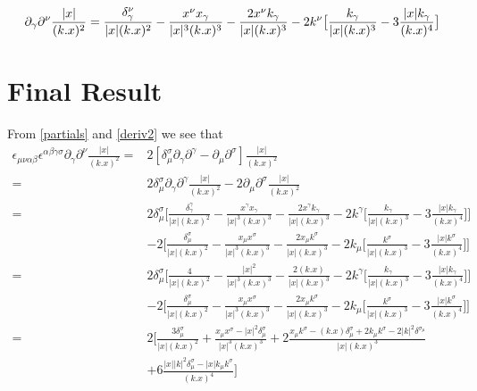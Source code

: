 \documentclass[10pt,a4paper]{article}
\begin{document}
	\begin{equation}
		\partial_{\gamma}\partial^{\nu}\frac{\lvert x \rvert}{(k.x)^{2}}\\ =
			\frac{\delta_{\gamma}^{\nu}}{\lvert x \rvert (k.x)^{2}} -\frac{x^{\nu}x_{\gamma}}{\lvert x \rvert ^{3} (k.x)^3} -\frac{2 x^{\nu} k_{\gamma}}{\lvert x \rvert (k.x)^{3}}-
			2k^{\nu}\big[\frac{k_{\gamma}}{\lvert x \rvert (k.x)^{3}}  - 3\frac{\lvert x \rvert k_{\gamma}}{(k.x)^{4}}\big]\label{deriv2}
	\end{equation}
	\section{Final Result}
	From \ref{partials} and \ref{deriv2} we see that
	\begin{align*}
		\epsilon_{\mu\nu\alpha\beta}\epsilon^{\alpha\beta\gamma\sigma}\partial_{\gamma}\partial^{\nu}\frac{\lvert x \rvert}{(k.x)^{2}}
	=&2[\delta_{\mu}^{\sigma}\partial_{\gamma}\partial^{\gamma}-\partial_{\mu}\partial^{\sigma}]\frac{\lvert x \rvert}{(k.x)^{2}}\\
	=&2\delta_{\mu}^{\sigma}\partial_{\gamma}\partial^{\gamma}\frac{\lvert x \rvert}{(k.x)^{2}}-2\partial_{\mu}\partial^{\sigma}\frac{\lvert x \rvert}{(k.x)^{2}}\\
	=&2\delta_{\mu}^{\sigma}\bigg[\frac{\delta_{\gamma}^{\gamma}}{\lvert x \rvert (k.x)^{2}} -\frac{x^{\gamma}x_{\gamma}}{\lvert x \rvert ^{3} (k.x)^3} -\frac{2 x^{\gamma} k_{\gamma}}{\lvert x \rvert (k.x)^{3}}-
2k^{\gamma}\big[\frac{k_{\gamma}}{\lvert x \rvert (k.x)^{3}}  - 3\frac{\lvert x \rvert k_{\gamma}}{(k.x)^{4}}\big]\bigg]\\&-2\bigg[\frac{\delta_{\mu}^{\sigma}}{\lvert x \rvert (k.x)^{2}} -\frac{x_{\mu}x^{\sigma}}{\lvert x \rvert ^{3} (k.x)^3} -\frac{2 x_{\mu} k^{\sigma}}{\lvert x \rvert (k.x)^{3}}-
2k_{\mu}\big[\frac{k^{\sigma}}{\lvert x \rvert (k.x)^{3}}  - 3\frac{\lvert x \rvert k^{\sigma}}{(k.x)^{4}}\big]\bigg]\\
	=&2\delta_{\mu}^{\sigma}\bigg[\frac{4}{\lvert x \rvert (k.x)^{2}} -\frac{\lvert x \rvert^{2}}{\lvert x \rvert ^{3} (k.x)^3} -\frac{2 (k.x)}{\lvert x \rvert (k.x)^{3}}-
	2k^{\gamma}\big[\frac{k_{\gamma}}{\lvert x \rvert (k.x)^{3}}  - 3\frac{\lvert x \rvert k_{\gamma}}{(k.x)^{4}}\big]\bigg]\\&-2\bigg[\frac{\delta_{\mu}^{\sigma}}{\lvert x \rvert (k.x)^{2}} -\frac{x_{\mu}x^{\sigma}}{\lvert x \rvert ^{3} (k.x)^3} -\frac{2 x_{\mu} k^{\sigma}}{\lvert x \rvert (k.x)^{3}}-
	2k_{\mu}\big[\frac{k^{\sigma}}{\lvert x \rvert (k.x)^{3}}  - 3\frac{\lvert x \rvert k^{\sigma}}{(k.x)^{4}}\big]\bigg]\\
	=&2\bigg[\frac{3\delta_{\mu}^{\sigma}}{\lvert x \rvert (k.x)^{2}}+
	\frac{x_{\mu}x^{\sigma}-\lvert x \rvert^{2}\delta_{\mu}^{\sigma}}{\lvert x \rvert ^{3} (k.x)^3}+
	2\frac{x_{\mu}k^{\sigma}-(k.x)\delta_{\mu}^{\sigma}+2k_{\mu}k^{\sigma}- 2\lvert k \rvert^{2}\delta^{\sigma_{\mu}}}{\lvert x \rvert (k.x)^3}\\
	&+6\frac{\lvert x \rvert \lvert k \rvert^{2}\delta_{\mu}^{\sigma}-\lvert x \rvert k_{\mu}k^{\sigma}}{(k.x)^{4}}\bigg]
	\end{align*}
\end{document}
